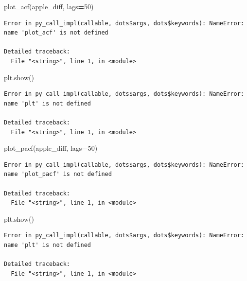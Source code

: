 \documentclass[]{book}
\newenvironment{Shaded}{\begin{snugshade}}{\end{snugshade}}
\newcommand{\DecValTok}[1]{\textcolor[rgb]{0.00,0.00,0.81}{#1}}
\newcommand{\NormalTok}[1]{#1}
\newcommand{\OperatorTok}[1]{\textcolor[rgb]{0.81,0.36,0.00}{\textbf{#1}}}
\begin{document}
\begin{Shaded}
\begin{Highlighting}[]
\NormalTok{plot_acf(apple_diff, lags}\OperatorTok{=}\DecValTok{50}\NormalTok{)}
\end{Highlighting}
\end{Shaded}

\begin{verbatim}
Error in py_call_impl(callable, dots$args, dots$keywords): NameError: name 'plot_acf' is not defined

Detailed traceback: 
  File "<string>", line 1, in <module>
\end{verbatim}

\begin{Shaded}
\begin{Highlighting}[]
\NormalTok{plt.show()}
\end{Highlighting}
\end{Shaded}

\begin{verbatim}
Error in py_call_impl(callable, dots$args, dots$keywords): NameError: name 'plt' is not defined

Detailed traceback: 
  File "<string>", line 1, in <module>
\end{verbatim}

\begin{Shaded}
\begin{Highlighting}[]
\NormalTok{plot_pacf(apple_diff, lags}\OperatorTok{=}\DecValTok{50}\NormalTok{)}
\end{Highlighting}
\end{Shaded}

\begin{verbatim}
Error in py_call_impl(callable, dots$args, dots$keywords): NameError: name 'plot_pacf' is not defined

Detailed traceback: 
  File "<string>", line 1, in <module>
\end{verbatim}

\begin{Shaded}
\begin{Highlighting}[]
\NormalTok{plt.show()}
\end{Highlighting}
\end{Shaded}

\begin{verbatim}
Error in py_call_impl(callable, dots$args, dots$keywords): NameError: name 'plt' is not defined

Detailed traceback: 
  File "<string>", line 1, in <module>
\end{verbatim}
\end{document}
